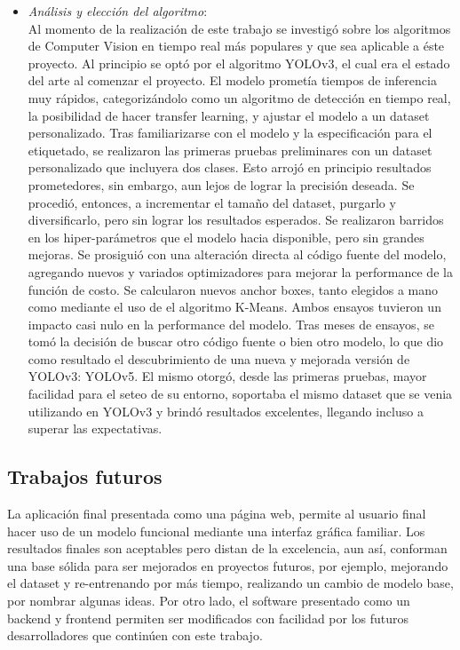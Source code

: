 \begin{itemize}
        \item \textit{Análisis y elección del algoritmo}: \\
            Al momento de la realización de este trabajo se investigó sobre los algoritmos de Computer Vision en tiempo real más populares y que sea aplicable a éste proyecto. Al principio se optó por el algoritmo YOLOv3, el cual era el estado del arte al comenzar el proyecto. El modelo prometía tiempos de inferencia muy rápidos, categorizándolo como un algoritmo de detección en tiempo real, la posibilidad de hacer transfer learning, y ajustar el modelo a un dataset personalizado. Tras familiarizarse con el modelo y la especificación para el etiquetado, se realizaron las primeras pruebas preliminares con un dataset personalizado que incluyera dos clases. Esto arrojó en principio resultados prometedores, sin embargo, aun lejos de lograr la precisión deseada. Se procedió, entonces, a incrementar el tamaño del dataset, purgarlo y diversificarlo, pero sin lograr los resultados esperados. Se realizaron barridos en los hiper-parámetros que el modelo hacia disponible, pero sin grandes mejoras. Se prosiguió con una alteración directa al código fuente del modelo, agregando nuevos y variados optimizadores para mejorar la performance de la función de costo. Se calcularon nuevos anchor boxes, tanto elegidos a mano como mediante el uso de el algoritmo K-Means. Ambos ensayos tuvieron un impacto casi nulo en la performance del modelo. Tras meses de ensayos, se tomó la decisión de buscar otro código fuente o bien otro modelo, lo que dio como resultado el descubrimiento de una nueva y mejorada versión de YOLOv3: YOLOv5. El mismo otorgó, desde las primeras pruebas, mayor facilidad para el seteo de su entorno, soportaba el mismo dataset que se venia utilizando en YOLOv3 y brindó resultados excelentes, llegando incluso a superar las expectativas.
        
 \end{itemize}

\subsection{Trabajos futuros}
La aplicación final presentada como una página web, permite al usuario final hacer uso de un modelo funcional mediante una interfaz gráfica familiar. Los resultados finales son aceptables pero distan de la excelencia, aun así, conforman una base sólida para ser mejorados en proyectos futuros, por ejemplo, mejorando el dataset y re-entrenando por más tiempo, realizando un cambio de modelo base, por nombrar algunas ideas. Por otro lado, el software presentado como un backend y frontend permiten ser modificados con facilidad por los futuros desarrolladores que continúen con este trabajo.

